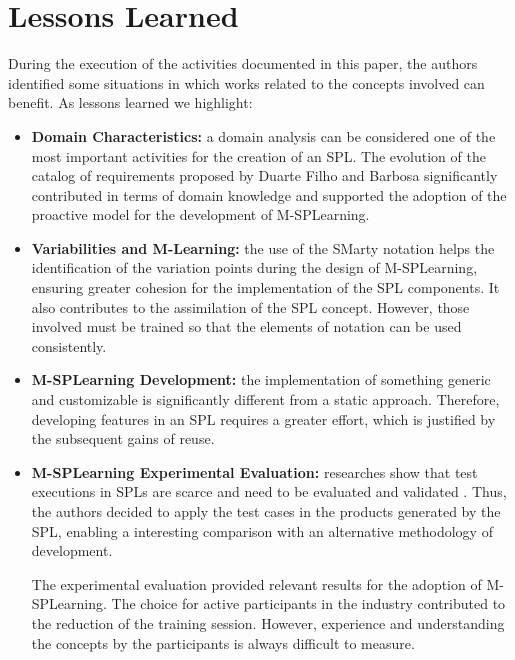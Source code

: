 \section{Lessons Learned}\label{section5}

During the execution of the activities documented in this paper, the authors identified some situations in which works related to the concepts involved can benefit. As lessons learned we highlight:

\begin{itemize}
    \item \textbf{Domain Characteristics:} a domain analysis can be considered one of the most important activities for the creation of an SPL. The evolution of the catalog of requirements proposed by Duarte Filho and Barbosa \cite{filho13} significantly contributed in terms of domain knowledge and supported the adoption of the proactive model for the development of M-SPLear\allowbreak ning.
    \item \textbf{Variabilities and M-Learning:} the use of the SMarty notation helps the identification of the variation points during the design of M-SPLear\allowbreak ning, ensuring greater cohesion for the implementation of the SPL components. It also contributes to the assimilation of the SPL concept. However, those involved must be trained so that the elements of notation can be used consistently.
    \item \textbf{M-SPLear\allowbreak ning Development:} the implementation of something generic and customizable is significantly different from a static approach. Therefore, developing features in an SPL requires a greater effort, which is justified by the subsequent gains of reuse.
    \item \textbf{M-SPLear\allowbreak ning Experimental Evaluation:} researches show that test executions in SPLs are scarce and need to be evaluated and validated \cite{engstrom11}. Thus, the authors decided to apply the test cases in the products generated by the SPL, enabling a interesting comparison with an alternative methodology of development.
  
    The experimental evaluation provided relevant results for the adoption of M-SPLear\allowbreak ning. The choice for active participants in the industry contributed to the reduction of the training session. However, experience and understanding the concepts by the participants is always difficult to measure.
\end{itemize}